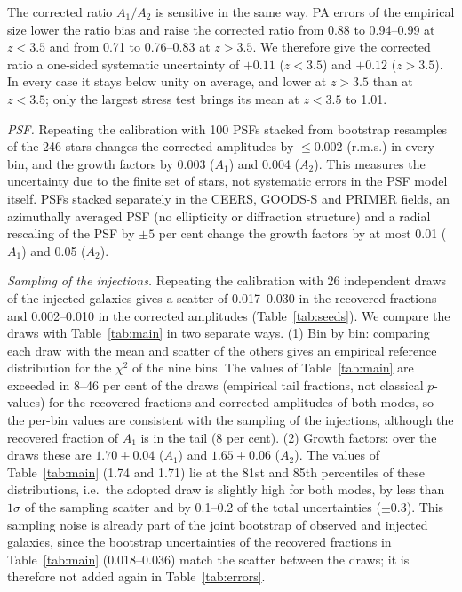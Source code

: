 \documentclass[fleqn,usenatbib]{mnras}
\begin{document}
The corrected ratio $A_1/A_2$ is sensitive in the same way. PA errors of the
empirical size lower the ratio bias and raise the corrected ratio from 0.88 to
0.94--0.99 at $z<3.5$ and from 0.71 to 0.76--0.83 at $z>3.5$. We therefore give
the corrected ratio a one-sided systematic uncertainty of $+0.11$ ($z<3.5$) and
$+0.12$ ($z>3.5$). In every case it stays below unity on average, and lower at
$z>3.5$ than at $z<3.5$; only the largest stress test brings its mean at $z<3.5$
to 1.01.

\textit{PSF.} Repeating the calibration with 100 PSFs stacked from bootstrap
resamples of the 246 stars changes the corrected amplitudes by $\leq0.002$
(r.m.s.) in every bin, and the growth factors by 0.003 ($A_1$) and 0.004
($A_2$). This measures the uncertainty due to the finite set of stars, not systematic
errors in the PSF model itself. PSFs stacked separately in the CEERS, GOODS-S and PRIMER
fields, an azimuthally averaged PSF (no ellipticity or diffraction structure) and
a radial rescaling of the PSF by $\pm5$ per cent change the growth factors by at
most 0.01 ($A_1$) and 0.05 ($A_2$).

\textit{Sampling of the injections.} Repeating the calibration with 26
independent draws of the injected galaxies gives a scatter of 0.017--0.030 in the
recovered fractions and 0.002--0.010 in the corrected amplitudes
(Table~\ref{tab:seeds}). We compare the draws with Table~\ref{tab:main} in two
separate ways. (1) Bin by bin: comparing each draw with the mean and scatter of
the others gives an empirical reference distribution for the $\chi^2$ of the nine
bins. The values of Table~\ref{tab:main} are exceeded in 8--46 per cent of the
draws (empirical tail fractions, not classical $p$-values) for the recovered
fractions and corrected amplitudes of both modes, so the per-bin values are
consistent with the sampling of the injections, although the recovered fraction
of $A_1$ is in the tail (8 per cent). (2) Growth factors: over the draws these
are $1.70\pm0.04$ ($A_1$) and $1.65\pm0.06$ ($A_2$). The values of
Table~\ref{tab:main} (1.74 and 1.71) lie at the 81st and 85th percentiles of
these distributions, i.e.\ the adopted draw is slightly high for both modes, by
less than $1\sigma$ of the sampling scatter and by 0.1--0.2 of the total
uncertainties ($\pm0.3$). This sampling noise is already part of the joint
bootstrap of observed and injected galaxies, since the bootstrap uncertainties of
the recovered fractions in Table~\ref{tab:main} (0.018--0.036) match the scatter
between the draws; it is therefore not added again in Table~\ref{tab:errors}.
\end{document}
